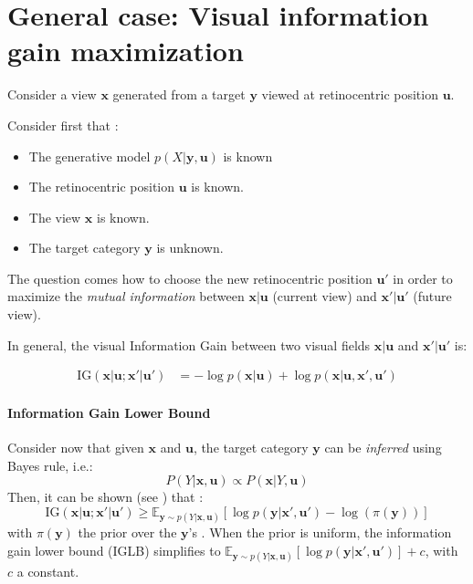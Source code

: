 \section*{General case: Visual information gain maximization}\label{sec:case1}

Consider a view $\boldsymbol{x}$ generated from a target $\boldsymbol{y}$ viewed at retinocentric position $\boldsymbol{u}$. 

Consider first that :
\begin{itemize}
	\item The generative model  $p(X|\boldsymbol{y}, \boldsymbol{u})$ is known
	\item The retinocentric position  $\boldsymbol{u}$ is known.
	\item The view $\boldsymbol{x}$ is known.
	\item The target category  $\boldsymbol{y}$ is unknown.
\end{itemize} 



The question comes how to choose the new retinocentric position $\boldsymbol{u}'$ in order to maximize the \emph{mutual information} between $\boldsymbol{x}|\boldsymbol{u}$ (current view) and $\boldsymbol{x}'|\boldsymbol{u}'$ (future view).

In general, the visual Information Gain between two visual fields $\boldsymbol{x}|\boldsymbol{u}$  and $\boldsymbol{x}'|\boldsymbol{u}'$ is:

\begin{align*}
\text{IG}(\boldsymbol{x}|\boldsymbol{u}; \boldsymbol{x}'| \boldsymbol{u}') 
&= -\log p(\boldsymbol{x}|\boldsymbol{u}) 
+ \log p(\boldsymbol{x}|\boldsymbol{u}, \boldsymbol{x}', \boldsymbol{u}')
\end{align*}

\paragraph{Information Gain Lower Bound}
Consider now that given  $\boldsymbol{x}$ and $\boldsymbol{u}$, the target category  $\boldsymbol{y}$ can be \emph{inferred} using Bayes rule, i.e.:
$$ P(Y|\boldsymbol{x}, \boldsymbol{u}) \propto  P(\boldsymbol{x}|Y, \boldsymbol{u}) $$
Then, it can be shown (see \cite{dauce2018}) that :
$$\text{IG}(\boldsymbol{x}|\boldsymbol{u}; \boldsymbol{x}'| \boldsymbol{u}') \geq \mathbb{E}_{\boldsymbol{y}\sim p(Y|\boldsymbol{x}, \boldsymbol{u})} \left[\log p(\boldsymbol{y}|\boldsymbol{x}', \boldsymbol{u}') - \log(\pi(\boldsymbol{y})) \right]$$
with  $\pi(\boldsymbol{y})$ the prior over the $\boldsymbol{y}$'s .
When the prior is uniform, the information gain lower bound (IGLB) simplifies to $\mathbb{E}_{\boldsymbol{y}\sim p(Y|\boldsymbol{x}, \boldsymbol{u})} \left[\log p(\boldsymbol{y}|\boldsymbol{x}', \boldsymbol{u}')\right] + c$, with $c$ a constant.

